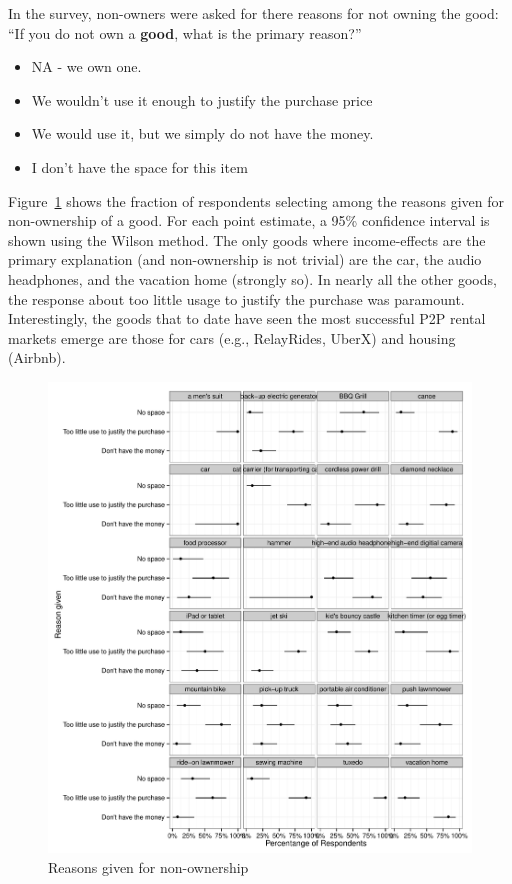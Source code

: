 \documentclass[11pt]{article}
\begin{document}
In the survey, non-owners were asked for there reasons for not owning the good:
``If you do not own a {\bf good}, what is the primary reason?''
\begin{itemize} 
\item NA - we own one.
\item We wouldn't use it enough to justify the purchase price
\item We would use it, but we simply do not have the money.
\item I don't have the space for this item
\end{itemize} 
Figure~\ref{fig:reasons} shows the fraction of respondents selecting among the reasons given for non-ownership of a good. 
For each point estimate, a 95\% confidence interval is shown using the Wilson method. 
The only goods where income-effects are the primary explanation (and non-ownership is not trivial) are the car, the audio headphones, and the vacation home (strongly so). 
In nearly all the other goods, the response about too little usage to justify the purchase was paramount. 
Interestingly, the goods that to date have seen the most successful P2P rental markets emerge are those for cars (e.g., RelayRides, UberX) and housing (Airbnb). 

\begin{figure}
\centering 
\caption{Reasons given for non-ownership} 
\label{fig:reasons}
\begin{minipage}{0.90 \linewidth}
\includegraphics[width = \linewidth]{./plots/reasons.pdf} 
\end{minipage} 
\end{figure} 
\end{document}

